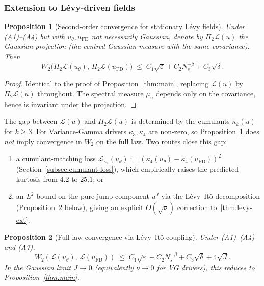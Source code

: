 \documentclass[review,12pt]{elsarticle}
\newtheorem{proposition}{Proposition}
\begin{document}
\subsubsection{Extension to L\'evy-driven fields}

\begin{proposition}[Second-order convergence for stationary L\'evy fields]
\label{thm:levy-ext}
Under (A1)--(A4) but with \(u_\theta, u_{\mathrm{FD}}\) not
necessarily Gaussian, denote by \(\Pi_2\mathcal L(u)\) the Gaussian
projection (the centred Gaussian measure with the same covariance).
Then
\[
W_2\bigl(\Pi_2\mathcal L(u_\theta),\,
\Pi_2\mathcal L(u_{\mathrm{FD}})\bigr)
\;\le\; C_1\sqrt\varepsilon + C_2 N_s^{-\beta} + C_3\sqrt\delta.
\]
\end{proposition}
\begin{proof}
Identical to the proof of Proposition~\ref{thm:main}, replacing
\(\mathcal L(u)\) by \(\Pi_2\mathcal L(u)\) throughout. The spectral
measure \(\mu_u\) depends only on the covariance, hence is invariant
under the projection.
\end{proof}

The gap between \(\mathcal L(u)\) and \(\Pi_2\mathcal L(u)\) is
determined by the cumulants \(\kappa_k(u)\) for \(k \ge 3\). For
Variance-Gamma drivers \(\kappa_3, \kappa_4\) are non-zero, so
Proposition~\ref{thm:levy-ext} does \emph{not} imply convergence in
\(W_2\) on the full law. Two routes close this gap:
\begin{enumerate}
\item a cumulant-matching loss
$\mathcal{L}_{\kappa_4}(u_\theta):=(\kappa_4(u_\theta)-\kappa_4(u_{\mathrm{FD}}))^2$
(Section~\ref{subsec:cumulant-loss}), which empirically raises the
predicted kurtosis from $4.2$ to $25.1$; or
\item an $L^2$ bound on the pure-jump component $u^J$ via the
L\'evy--It\^o decomposition (Proposition~\ref{prop:levy-ito} below),
giving an explicit $O(\sqrt\nu)$ correction to~\eqref{thm:levy-ext}.
\end{enumerate}

\begin{proposition}[Full-law convergence via L\'evy--It\^o coupling]
\label{prop:levy-ito}
Under (A1)--(A4) and (A7),
\begin{equation}
\label{eq:levy-ito-bound}
W_2\!\left(\mathcal{L}(u_\theta),\,\mathcal{L}(u_{\mathrm{FD}})\right)
\;\le\;C_1\sqrt{\varepsilon}+C_2 N_s^{-\beta}+C_3\sqrt{\delta}
+4\sqrt{J}.
\end{equation}
In the Gaussian limit $J\to 0$ (equivalently $\nu\to 0$ for VG
drivers), this reduces to Proposition~\ref{thm:main}.
\end{proposition}
\end{document}
